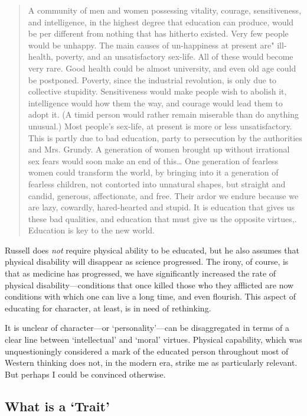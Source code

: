 \begin{quote}

A community of men and women possessing vitality, courage, sensitiveness, and intelligence, in the highest degree that education can produce, would be per different from nothing that has hitherto existed. Very few people would be unhappy. The main causes of un-happiness at present are" ill-health, poverty, and an unsatisfactory sex-life. All of these would become very rare. Good health could be almost university, and even old age could be postponed. Poverty, since the industrial revolution, is only due to collective stupidity. Sensitiveness would make people wish to abolish it, intelligence would how them the way, and courage would lead them to adopt it. (A timid person would rather remain miserable than do anything unusual.) Most people's sex-life, at present is more or less unsatisfactory. This is partly due to bad education, party to persecution by the authorities and Mrs. Grundy. A generation of women brought up without irrational sex fears would soon make an end of this{\ldots} One generation of fearless women could transform the world, by bringing into it a generation of fearless children, not contorted into unnatural shapes, but straight and candid, generous, affectionate, and free. Their ardor we endure because we are lazy, cowardly, hared-hearted and stupid. It is education that gives us these bad qualities, and education that must give us the opposite virtues,. Education is key to the new world. ~\citep[p. 82--83]{Russell:GWZfGDU3}
\end{quote}

Russell does \emph{not} require physical ability to be educated, but he also assumes that physical disability will disappear as science progressed. The irony, of course, is that as medicine has progressed, we have significantly increased the rate of physical disability---conditions that once killed those who they afflicted are now conditions with which one can live a long time, and even flourish. This aspect of educating for character, at least, is in need of rethinking.

It is unclear of character---or `personality'---can be disaggregated in terms of a clear line between `intellectual' and `moral' virtues. Physical capability, which was unquestioningly considered a mark of the educated person throughout most of Western thinking does not, in the modern era, strike me as particularly relevant. But perhaps I could be convinced otherwise.

\subsection{What is a `Trait'}
\label{whatisatrait}

